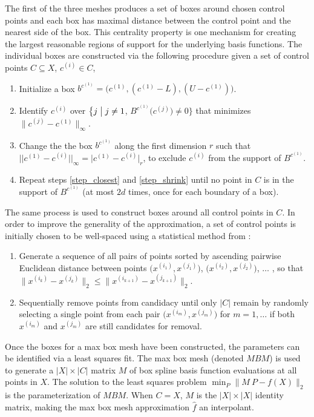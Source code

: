 The first of the three meshes produces a set of boxes around chosen control points and each box has maximal distance between the control point and the nearest side of the box. This centrality property is one mechanism for creating the largest reasonable regions of support for the underlying basis functions. The individual boxes are constructed via the following procedure given a set of control points $C \subseteq X$, $c^{(i)} \in C$,
\begin{enumerate}
  \item Initialize a box $b^{c^{(1)}} = \bigl(c^{(1)}, (c^{(1)} - L), (U - c^{(1)})\bigr)$. \label{step_init}
  \item Identify $c^{(i)}$ over $\bigl\{ j \bigm| j \ne 1$, $B^{c^{(1)}}\bigl( c^{(j)} \bigr) \ne 0 \bigr\}$ that minimizes $\bigl\|c^{(j)}-c^{(1)}\bigr\|_\infty$.  \label{step_closest}
  \item Change the the box $b^{c^{(1)}}$ along the first dimension $r$ such that $\bigl|\bigl|c^{(1)} - c^{(i)}\bigr|\bigr|_\infty = \bigl\vert c^{(1)} - c^{(i)}\bigr\vert_r $, to exclude $c^{(i)}$ from the support of $B^{c^{(1)}}$. \label{step_shrink}
  \item Repeat steps \ref{step_closest} and \ref{step_shrink} until no point in $C$ is in the support of $B^{c^{(1)}}$ (at most $2d$ times, once for each boundary of a box).
\end{enumerate}

The same process is used to construct boxes around all control points in $C$. In order to improve the generality of the approximation, a set of control points is initially chosen to be well-spaced using a statistical method from \cite{amos2014algorithm}:

\begin{enumerate}
\item Generate a sequence of all pairs of points sorted by ascending pairwise Euclidean distance between points $\bigl(x^{(i_1)},x^{(j_1)}\bigr)$, $\bigl(x^{(i_2)},x^{(j_2)}\bigr)$, $\ldots$ , so that $\bigl\|x^{(i_k)}-x^{(j_k)}\bigr\|_2 \leq \bigl\|x^{(i_{k+1})}-x^{(j_{k+1})}\bigr\|_2$.
\item Sequentially remove points from candidacy until only $|C|$ remain by randomly selecting a single point from each pair $\bigl(x^{(i_m)}, x^{(j_m)}\bigr)$ for $m = 1,\ldots$ if both $x^{(i_m)}$ and $x^{(j_m)}$ are still candidates for removal.
\end{enumerate}

Once the boxes for a max box mesh have been constructed, the parameters can be identified via a least squares fit. The max box mesh (denoted $MBM$) is used to generate a $|X| \times |C|$ matrix $M$ of box spline basis function evaluations at all points in $X$. The solution to the least squares problem $\min_P \bigl\| M \ P - f(X) \bigr\|_2$ is the parameterization of $MBM$. When $C = X$, $M$ is the $|X| \times |X|$ identity matrix, making the max box mesh approximation $\hat f$ an interpolant.

